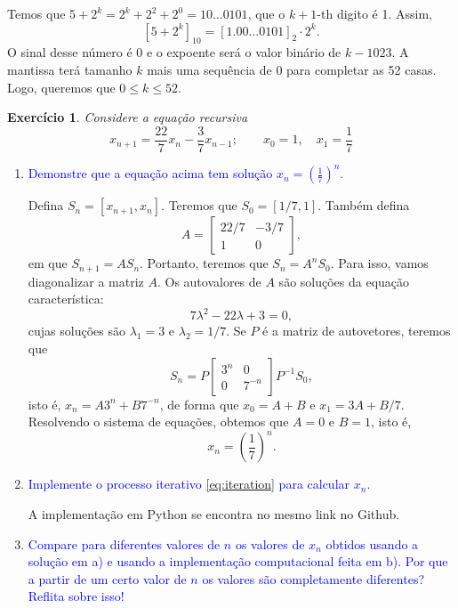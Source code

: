 \documentclass[a4paper,12pt]{article}
\theoremstyle{exer}
\newtheorem{exercise}{Exercício}
\theoremstyle{definition}
\newcommand{\enu}[1]{\textcolor{blue}{#1}}
\begin{document}
Temos que $5 + 2^k = 2^k + 2^2 + 2^0 = 10\dots 0101$, que o $k+1$-th digito é
1. Assim, 
$$
[5 + 2^k]_{10} = [1.00\dots 0101]_2\cdot 2^k.
$$
O sinal desse número é 0 e o expoente será o valor binário de $k - 1023$. A
mantissa terá tamanho $k$ mais uma sequência de 0 para completar as 52 casas. Logo, queremos que $0 \le k \le 52$. 

\begin{exercise}
    Considere a equação recursiva 
    \begin{equation}
        \label{eq:iteration}
        x_{n+1} = \frac{22}{7}x_n - \frac{3}{7}x_{n-1}; \qquad x_0 = 1, \quad x_1 = \frac{1}{7}
    \end{equation}
\end{exercise}

\begin{enumerate}
    \item \enu{Demonstre que a equação acima tem solução $x_n =
    \left(\frac{1}{7}\right)^n$.} 

    Defina $S_n = [x_{n+1}, x_n]$. Teremos que $S_0 = [1/7, 1]$. Também defina
    $$
    A = \begin{bmatrix}
        22/7 & -3/7 \\
        1 & 0
    \end{bmatrix}, 
    $$
    em que $S_{n+1} = AS_n$. Portanto, teremos que $S_n = A^nS_0$. Para isso,
    vamos diagonalizar a matriz $A$. Os autovalores de $A$ são soluções da
    equação característica: 
    $$
    7\lambda^2 - 22\lambda + 3 = 0, 
    $$
    cujas soluções são $\lambda_1 = 3$ e $\lambda_2 = 1/7$. Se $P$ é a matriz
    de autovetores, teremos que 
    $$
    S_n = P\begin{bmatrix}
        3^n & 0 \\ 0 & 7^{-n}
    \end{bmatrix}P^{-1}S_0, 
    $$
    isto é, $x_n = A3^n + B7^{-n}$, de forma que $x_0 = A + B$ e $x_1 = 3A +
    B/7$. Resolvendo o sistema de equações, obtemos que $A = 0$ e $B = 1$,
    isto é, 
    $$
    x_n = \left(\frac{1}{7}\right)^n.
    $$

    \item \enu{Implemente o processo iterativo \eqref{eq:iteration} para calcular
    $x_n$.}

    A implementação em Python se encontra no mesmo link no Github.     

    \item \enu{Compare para diferentes valores de $n$ os valores de $x_n$ obtidos
    usando a solução em a) e usando a implementação computacional feita em b).
    Por que a partir de um certo valor de $n$ os valores são completamente
    diferentes? Reflita sobre isso!}


\end{enumerate}
\end{document}
